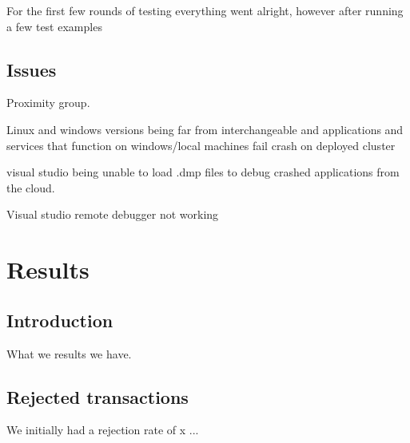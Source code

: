 \documentclass[a4paper,10pt,titlepage]{report}
\begin{document}
For the first few rounds of testing everything went alright, however after running a few test examples 

    \subsection{Issues}
    Proximity group.

    Linux and windows versions being far from interchangeable and applications and services that function on windows/local machines fail crash on deployed cluster

    visual studio being unable to load .dmp files to debug crashed applications from the cloud.

    Visual studio remote debugger not working
%
%
%
%
%
%
%
%
%

%


    \section{Results}

    \subsection{Introduction}

    What we results we have.

    \subsection{Rejected transactions}
    We initially had a rejection rate of x
    ...
\end{document}
